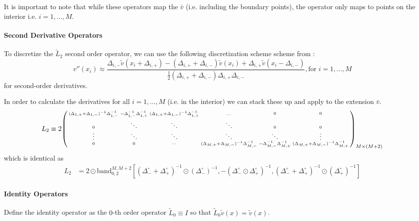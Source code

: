 \documentclass[11pt]{article}
\newcommand{\band}{\ensuremath{\mathrm{band}}}
\newenvironment{psmallmatrix}
{\left(\begin{smallmatrix}}
	{\end{smallmatrix}\right)}
\theoremstyle{definition}
\begin{document}
It is important to note that while these operators map the $\bar{v}$ (i.e. including the boundary points), the operator only maps to points on the interior i.e. $i = 1, \ldots, M$.



\paragraph{Second Derivative Operators}
To discretize the $\tilde{L}_2$ second order operator, we can use the following discretization scheme scheme from \cite{achdou17}:
\begin{equation}
v''(x_i) \approx \dfrac{ \Delta_{i,-} \tilde{v}( x_i + \Delta_{i,+}) - (\Delta_{i,+} + \Delta_{i,-}) \tilde{v}( x_i ) + \Delta_{i,+} \tilde{v}( x_i - \Delta_{i,-})}{\frac{1}{2}(\Delta_{i,+} + \Delta_{i,-}) \Delta_{i,+} \Delta_{i,-} }, \text{for } i = 1, \ldots, M
\end{equation}
for second-order derivatives.


In order to calculate the derivatives for all $i = 1, \ldots, M$ (i.e. in the interior) we can stack these up and apply to the extension $\bar{v}$.
\begin{align}\label{eq:L-2-extended} \small
{L}_2 \equiv 2 \begin{psmallmatrix}
(\Delta_{1,+}+\Delta_{1,-})^{-1}\Delta_{1,-}^{-1} &-\Delta_{1,-}^{-1} \Delta_{1,+}^{-1}  & (\Delta_{1,+}+\Delta_{1,-})^{-1} \Delta_{1,+}^{-1}&\dots&0&0\\
0 & \ddots & \ddots &\ddots & 0 & 0\\
\vdots&\ddots &\ddots & \ddots & \ddots & \vdots\\
0&0&\cdots&
(\Delta_{M,+}+\Delta_{M,-})^{-1}\Delta_{M,-}^{-1} &-\Delta_{M,-}^{-1} \Delta_{M,+}^{-1}  &
(\Delta_{M,+}+\Delta_{M,-})^{-1}\Delta_{M,+}^{-1}
\end{psmallmatrix}_{M\times (M+2)} 
\end{align}
which is identical as
\begin{align}
L_2 &= 2 \odot \band_{0,2}^{M,M+2} \left[(\Delta_-^\circ + \Delta_+^\circ)^{-1} \odot (\Delta_{-}^\circ)^{-1}, -(\Delta_-^\circ \odot \Delta_+^\circ)^{-1} , (\Delta_-^\circ + \Delta_+^\circ)^{-1} \odot (\Delta_{+}^\circ)^{-1} \right]
\end{align}


\paragraph{Identity Operators}
Define the identity operator as the $0$-th order operator $\tilde{L}_0 \equiv I$ so that $\tilde{L}_0 \tilde{v}(x) = \tilde{v}(x)$.
\end{document}

